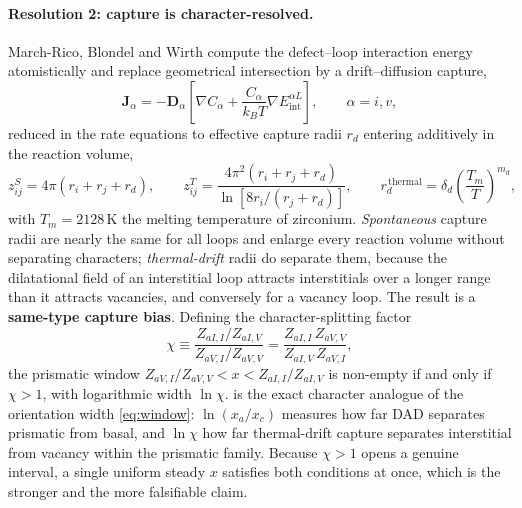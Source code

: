 \documentclass{article}
\newcommand{\Dten}{\bm D}
\begin{document}
\paragraph{Resolution 2: capture is character-resolved.} March-Rico, Blondel
and Wirth \citep{marchrico2025} compute the defect--loop interaction energy
atomistically and replace geometrical intersection by a drift--diffusion capture,
\begin{equation}
  \bm J_\alpha=-\Dten_\alpha\left[\nabla C_\alpha
    +\frac{C_\alpha}{k_BT}\nabla E^{\alpha L}_{\mathrm{int}}\right],
  \qquad\alpha=i,v,
  \label{eq:drift-diffusion}
\end{equation}
reduced in the rate equations to effective capture radii $r_d$ entering
additively in the reaction volume,
\begin{equation}
  z^S_{ij}=4\pi(r_i+r_j+r_d),
  \qquad
  z^T_{ij}=\frac{4\pi^2(r_i+r_j+r_d)}{\ln[8r_i/(r_j+r_d)]},
  \qquad
  r_d^{\,\mathrm{thermal}}=\delta_d\left(\frac{T_m}{T}\right)^{m_d},
  \label{eq:zST}
\end{equation}
with $T_m=2128\,$K the melting temperature of zirconium. \emph{Spontaneous}
capture radii are nearly the same for all loops and enlarge every reaction
volume without separating characters; \emph{thermal-drift} radii do separate
them, because the dilatational field of an interstitial loop attracts
interstitials over a longer range than it attracts vacancies, and conversely for
a vacancy loop. The result is a \textbf{same-type capture bias}. Defining the
character-splitting factor
\begin{equation}
  \chi\equiv\frac{Z_{aI,I}/Z_{aI,V}}{Z_{aV,I}/Z_{aV,V}}
   =\frac{Z_{aI,I}\,Z_{aV,V}}{Z_{aI,V}\,Z_{aV,I}},
  \label{eq:chi}
\end{equation}
the prismatic window $Z_{aV,I}/Z_{aV,V}<x<Z_{aI,I}/Z_{aI,V}$ is non-empty if and
only if $\chi>1$, with logarithmic width $\ln\chi$.  is the exact
character analogue of the orientation width \cref{eq:window}: $\ln(x_a/x_c)$
measures how far DAD separates prismatic from basal, and $\ln\chi$ how far
thermal-drift capture separates interstitial from vacancy within the prismatic
family. Because $\chi>1$ opens a genuine interval, a single uniform steady $x$
satisfies both conditions at once, which is the stronger and the more falsifiable
claim.
\end{document}

